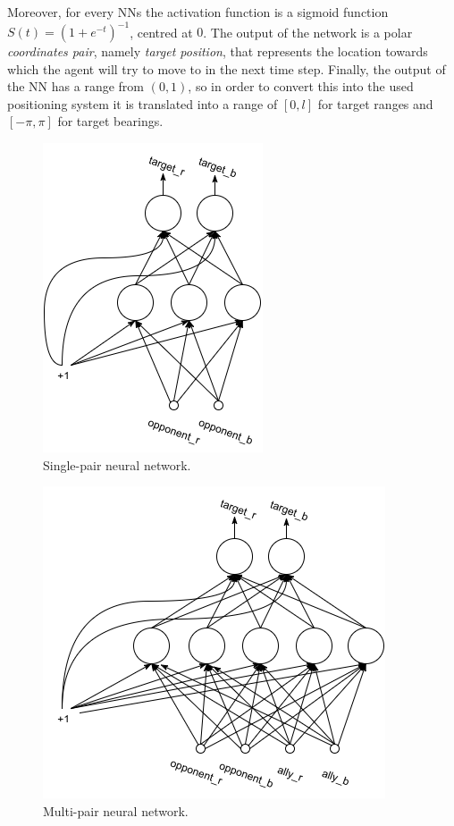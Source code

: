 \documentclass[conference]{IEEEtran}
\begin{document}
Moreover, for every NNs the activation function is a sigmoid function $S(t) = (1 + e^{-t})^{-1}$, centred at $0$. 
The output of the network is a polar \textit{coordinates pair}, namely \textit{target position}, that represents the
location towards which the agent will try to move to in the next time step.
Finally, the output of the NN has a range from $(0, 1)$, so in order to convert this into the used positioning system it is translated into a range of $[0, l]$ for target ranges and $[-\pi, \pi]$ for target bearings. 
 
\begin{figure}[t]
	\centering
	\includegraphics[width=0.5\hsize]{imgs/nn-design_single.png}
	\caption{Single-pair neural network.}
	\label{fig:single_pair_topology}
\end{figure}

\begin{figure}[t]
	\centering
	\includegraphics[width=0.8\hsize]{imgs/nn-design_multi.png}
	\caption{Multi-pair neural network.}
	\label{fig:multi_pair_topology}
\end{figure}
\end{document}
